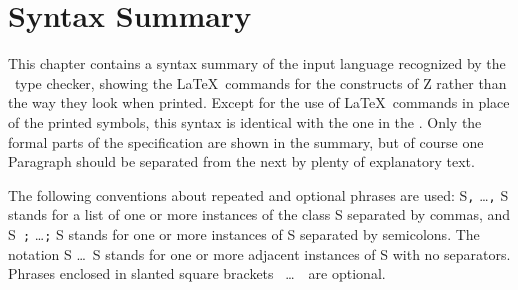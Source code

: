 {{{{{{\chapter{Syntax Summary}\label{syntax}

This chapter contains a syntax summary of the input language
recognized by the \fuzz\ type checker, showing the \LaTeX\ commands
for the constructs of Z rather than the way they look when printed.
Except for the use of \LaTeX\ commands in place of the printed
symbols, this syntax is identical with the one in the \ZRM.
Only the formal parts of the specification are shown in the summary,
but of course one {\sf Paragraph} should be separated from the next
by plenty of explanatory text.

The following conventions about repeated and optional phrases are
used: {\sf S{\tt ,} \dots{\tt ,} S} stands for a list of one or more
instances of the class {\sf S} separated by commas, and {\sf S{\tt
;} \dots{\tt ;} S} stands for one or more instances of {\sf S}
separated by semicolons.  The notation {\sf S \dots\ S} stands for one
or more adjacent instances of {\sf S} with no separators.  Phrases
enclosed in slanted square brackets \lopt\ \dots\ \ropt\ are optional.

}}}}}}
